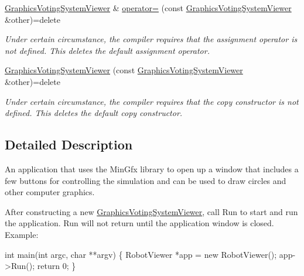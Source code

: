 \begin{DoxyCompactItemize}
\mbox{\label{classGraphicsVotingSystemViewer_ad21821b978498c3505a86daf95b89471}} 
\hyperlink{classGraphicsVotingSystemViewer}{Graphics\+Voting\+System\+Viewer} \& \hyperlink{classGraphicsVotingSystemViewer_ad21821b978498c3505a86daf95b89471}{operator=} (const \hyperlink{classGraphicsVotingSystemViewer}{Graphics\+Voting\+System\+Viewer} \&other)=delete
\begin{DoxyCompactList}\small\item\em Under certain circumstance, the compiler requires that the assignment operator is not defined. This {\ttfamily deletes} the default assignment operator. \end{DoxyCompactList}\item 
\mbox{\label{classGraphicsVotingSystemViewer_a92eb741397d9d9d3e7ce2c0c66c8608e}} 
\hyperlink{classGraphicsVotingSystemViewer_a92eb741397d9d9d3e7ce2c0c66c8608e}{Graphics\+Voting\+System\+Viewer} (const \hyperlink{classGraphicsVotingSystemViewer}{Graphics\+Voting\+System\+Viewer} \&other)=delete
\begin{DoxyCompactList}\small\item\em Under certain circumstance, the compiler requires that the copy constructor is not defined. This {\ttfamily deletes} the default copy constructor. \end{DoxyCompactList}\end{DoxyCompactItemize}


\subsection{Detailed Description}
An application that uses the Min\+Gfx library to open up a window that includes a few buttons for controlling the simulation and can be used to draw circles and other computer graphics. 

After constructing a new \hyperlink{classGraphicsVotingSystemViewer}{Graphics\+Voting\+System\+Viewer}, call Run to start and run the application. Run will not return until the application window is closed. Example\+:


\begin{DoxyCode}
\textcolor{keywordtype}{int} main(\textcolor{keywordtype}{int} argc, \textcolor{keywordtype}{char} **argv) \{
    RobotViewer *app = \textcolor{keyword}{new} RobotViewer();
    app->Run();
    \textcolor{keywordflow}{return} 0;
\}
\end{DoxyCode}


